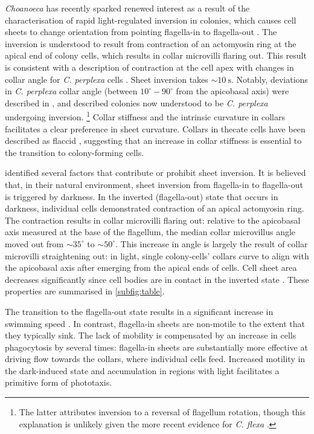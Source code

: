 \textit{Choanoeca} has recently sparked renewed interest as a result of the characterisation of rapid light-regulated inversion in colonies, which causes cell sheets to change orientation from pointing flagella-in to flagella-out \citep{brunet2019}.
The inversion is understood to result from contraction of an actomyosin ring at the apical end of colony cells, which results in collar microvilli flaring out. 
This result is consistent with a description of contraction at the cell apex with changes in collar angle for \textit{C. perplexa} cells \citep{leadbeater1977}.
Sheet inversion takes $\sim\SI{10}{\second}$.
Notably, deviations in \textit{C. perplexa} collar angle (between $10^\circ-90^\circ$ from the apicobasal axis) were described in \citet{ellis1930}, and \citet{leadbeater1983} described colonies now understood to be \textit{C. perplexa} undergoing inversion. 
\footnote{The latter attributes inversion to a reversal of flagellum rotation, though this explanation is unlikely given the more recent evidence for \textit{C. flexa} \citep{brunet2019}.}
Collar stiffness and the intrinsic curvature in collars facilitates a clear preference in sheet curvature. 
Collars in thecate cells have been described as flaccid \citep{leadbeater1977}, suggesting that an increase in collar stiffness is essential to the transition to colony-forming cells. 

\citet{brunet2019} identified several factors that contribute or prohibit sheet inversion. 
It is believed that, in their natural environment, sheet inversion from flagella-in to flagella-out is triggered by darkness. 
In the inverted (flagella-out) state that occurs in darkness, individual cells demonstrated contraction of an apical actomyosin ring.
The contraction results in collar microvilli flaring out: relative to the apicobasal axis measured at the base of the flagellum, the median collar microvillus angle moved out from $\sim35^\circ$ to $\sim50^\circ$.
This increase in angle is largely the result of collar microvilli straightening out: in light, single colony-cells' collars curve to align with the apicobasal axis after emerging from the apical ends of cells.
Cell sheet area decreases significantly since cell bodies are in contact in the inverted state \citep{thibaut}.
These properties are summarised in \cref{subfig:table}.

The transition to the flagella-out state results in a significant increase in swimming speed \citep{brunet2019}. 
In contrast, flagella-in sheets are non-motile to the extent that they typically sink. 
The lack of mobility is compensated by an increase in cells phagocytosis by several times: flagella-in sheets are substantially more effective at driving flow towards the collars, where individual cells feed.
Increased motility in the dark-induced state and accumulation in regions with light facilitates a primitive form of phototaxis.


